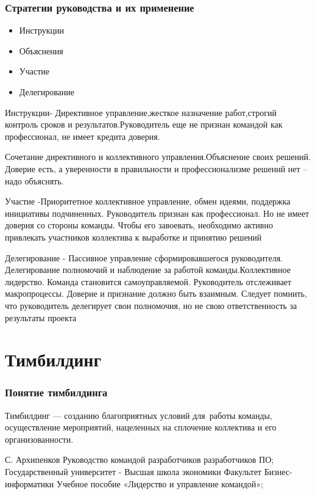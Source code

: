 \documentclass{../industrial-development}
\begin{document}
\begin{frame} \frametitle{ Стратегии руководства и их применение}
  \begin{itemize}
  \item Инструкции
  \item Объяснения
  \item Участие 
  \item Делегирование
  \end{itemize}
\end{frame}

\lecturenotes

Инструкции- Директивное управление,жесткое назначение работ,строгий контроль сроков и результатов.Руководитель еще не признан командой как
профессионал, не имеет кредита доверия.

Сочетание директивного и коллективного управления.Объяснение своих решений. Доверие есть, а уверенности в правильности и профессионализме решений нет – надо объяснять.

Участие -Приоритетное коллективное управление, обмен идеями, поддержка инициативы подчиненных. Руководитель признан как профессионал. Но не имеет доверия со стороны команды. Чтобы его завоевать, необходимо активно
привлекать участников коллектива к выработке и принятию решений

Делегирование - Пассивное управление сформировавшегося руководителя. Делегирование полномочий и наблюдение за работой команды.Коллективное
лидерство. Команда становится самоуправляемой. Руководитель отслеживает макропроцессы. Доверие и признание должно быть взаимным. Следует помнить, что руководитель делегирует свои полномочия, но не свою ответственность за
результаты проекта



\section{Тимбилдинг}

\begin{frame} \frametitle{Понятие тимбилдинга}
\begin{block}{}
Тимбилдинг --- созданию благоприятных условий для~работы команды, осуществление мероприятий, нацеленных на сплочение коллектива и его организованности.
\end{block}
\end{frame}



\begin{thebibliography}{99}


С. Архипенков Руководство командой разработчиков разработчиков ПО;
Государственный университет  - Высшая школа экономики Факультет Бизнес-информатики Учебное пособие «Лидерство и управление командой»;
\end{thebibliography}
\end{document}

